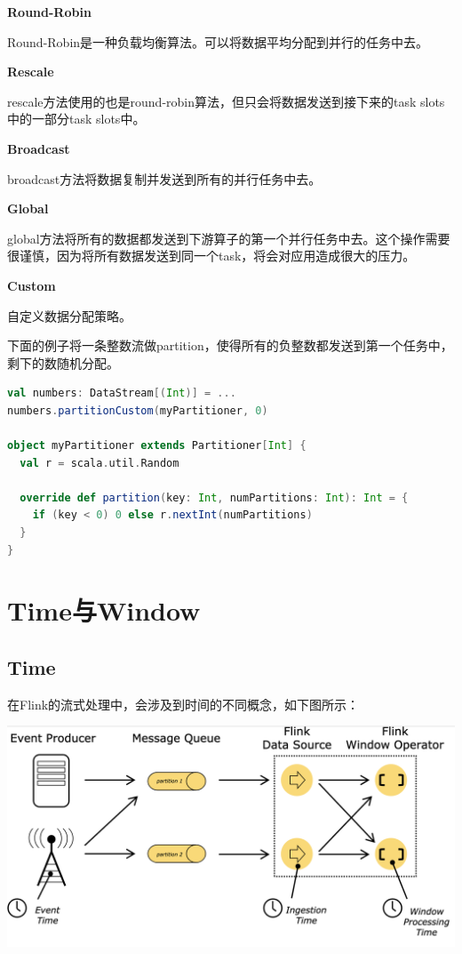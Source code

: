 \documentclass[oneside]{ctexbook}
\begin{document}
\textbf{Round-Robin}

Round-Robin是一种负载均衡算法。可以将数据平均分配到并行的任务中去。

\textbf{Rescale}

rescale方法使用的也是round-robin算法，但只会将数据发送到接下来的task slots中的一部分task slots中。

\textbf{Broadcast}

broadcast方法将数据复制并发送到所有的并行任务中去。

\textbf{Global}

global方法将所有的数据都发送到下游算子的第一个并行任务中去。这个操作需要很谨慎，因为将所有数据发送到同一个task，将会对应用造成很大的压力。

\textbf{Custom}

自定义数据分配策略。

下面的例子将一条整数流做partition，使得所有的负整数都发送到第一个任务中，剩下的数随机分配。

\begin{lstlisting}[language=scala]
val numbers: DataStream[(Int)] = ...
numbers.partitionCustom(myPartitioner, 0)

object myPartitioner extends Partitioner[Int] {
  val r = scala.util.Random

  override def partition(key: Int, numPartitions: Int): Int = {
    if (key < 0) 0 else r.nextInt(numPartitions)
  }
}
\end{lstlisting}

\chapter{Time与Window}

\section{Time}

在Flink的流式处理中，会涉及到时间的不同概念，如下图所示：

\noindent \includegraphics[width=\textwidth]{event_ingestion_processing_time.png}
\end{document}

